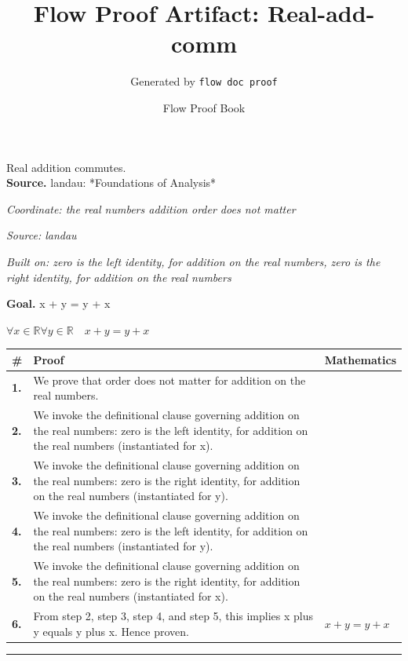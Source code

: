 \documentclass[11pt]{article}
\title{Flow Proof Artifact: Real-add-comm}
\author{Generated by \texttt{flow doc proof}}
\date{Flow Proof Book}
\theoremstyle{definition}
\begin{document}
\maketitle
Real addition commutes.\\[0.5em]
\textbf{Source.} landau: *Foundations of Analysis*\\[0.5em]
\bigskip
{}\par
\smallskip\noindent\textit{Coordinate: the real numbers \cdot addition \cdot order does not matter}\par
\smallskip\noindent\textit{Source: landau}\par
\smallskip\noindent\textit{Built on: zero is the left identity, for addition on the real numbers, zero is the right identity, for addition on the real numbers}\par
\medskip
\noindent\textbf{Goal.} x + y = y + x\par
\noindent$\displaystyle \forall x \in \mathbb{R} \forall y \in \mathbb{R}\quad x + y = y + x$\par
\medskip
\noindent
\begin{tabular}{@{} >{\raggedright\arraybackslash}p{} >{\raggedright\arraybackslash}p{} >{\raggedleft\arraybackslash}p{} @{}}
\textbf{\#} & \textbf{Proof} & \textbf{Mathematics} \\
\midrule
\textbf{1.} & We prove that order does not matter for addition on the real numbers. & \\[0.45em]
\textbf{2.} & We invoke the definitional clause governing addition on the real numbers: zero is the left identity, for addition on the real numbers (instantiated for x). & \\[0.45em]
\textbf{3.} & We invoke the definitional clause governing addition on the real numbers: zero is the right identity, for addition on the real numbers (instantiated for y). & \\[0.45em]
\textbf{4.} & We invoke the definitional clause governing addition on the real numbers: zero is the left identity, for addition on the real numbers (instantiated for y). & \\[0.45em]
\textbf{5.} & We invoke the definitional clause governing addition on the real numbers: zero is the right identity, for addition on the real numbers (instantiated for x). & \\[0.45em]
\textbf{6.} & From step 2, step 3, step 4, and step 5, this implies x plus y equals y plus x. Hence proven. & $\displaystyle x + y = y + x$ \\[0.45em]
\bottomrule
\end{tabular}
\label{thm:Real-addition-order_does_not_matter}
\par\medskip\hrule
\end{document}

